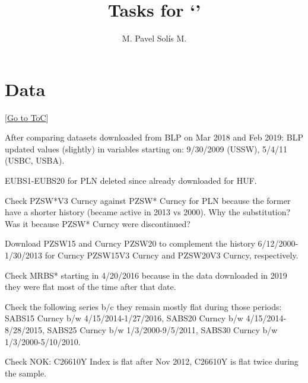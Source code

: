 \documentclass[12pt]{article}
\newcommand{\gototoc}{\vspace{-1.8cm} \null\hfill [\hyperlink{toc}{Go to ToC}] \newline}
\begin{document}
	\title{Tasks for `'}
	\author{M. Pavel Solís M.}
	\date{}
	\maketitle
	\hypertarget{toc}{}								 %
	\tableofcontents
	\vspace{2.5\bigskipamount}
	

\section{Data}
\gototoc
\begin{todolist}
	\item After comparing datasets downloaded from BLP on Mar 2018 and Feb 2019: BLP updated values (slightly) in variables starting on: 9/30/2009 (USSW), 5/4/11 (USBC, USBA).
	\item EUBS1-EUBS20 for PLN deleted since already downloaded for HUF.
	\item Check PZSW*V3 Curncy against PZSW* Curncy for PLN because the former have a shorter history (became active in 2013 vs 2000). Why the substitution? Was it because PZSW* Curncy were discontinued?
	\item Download PZSW15 and Curncy PZSW20 to complement the history 6/12/2000-1/30/2013 for Curncy PZSW15V3 Curncy and PZSW20V3 Curncy, respectively.
	\item Check MRBS* starting in 4/20/2016 because in the data downloaded in 2019 they were flat most of the time after that date.
	\item Check the following series b/c they remain mostly flat during those periods: SABS15 Curncy b/w 4/15/2014-1/27/2016, SABS20 Curncy b/w 4/15/2014-8/28/2015, SABS25 Curncy b/w 1/3/2000-9/5/2011, SABS30 Curncy b/w 1/3/2000-5/10/2010.
	\item Check NOK: C26610Y Index is flat after Nov 2012, C26610Y is flat twice during the sample.
\end{todolist}
\end{document}
